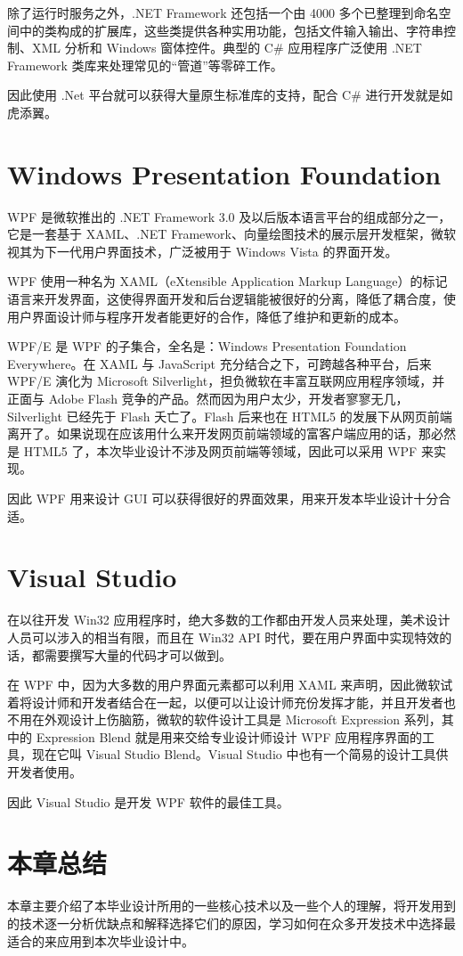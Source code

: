 除了运行时服务之外，.NET Framework 还包括一个由 4000 多个已整理到命名空间中的类构成的扩展库，这些类提供各种实用功能，包括文件输入输出、字符串控制、XML 分析和 Windows 窗体控件。典型的 C\# 应用程序广泛使用 .NET Framework 类库来处理常见的``管道''等零碎工作。

因此使用 .Net 平台就可以获得大量原生标准库的支持，配合 C\# 进行开发就是如虎添翼。

\section{Windows Presentation Foundation}

WPF 是微软推出的 .NET Framework 3.0 及以后版本语言平台的组成部分之一，它是一套基于 XAML、.NET Framework、向量绘图技术的展示层开发框架，微软视其为下一代用户界面技术，广泛被用于 Windows Vista 的界面开发。

WPF 使用一种名为 XAML（eXtensible Application Markup Language）的标记语言来开发界面，这使得界面开发和后台逻辑能被很好的分离，降低了耦合度，使用户界面设计师与程序开发者能更好的合作，降低了维护和更新的成本。

WPF/E 是 WPF 的子集合，全名是：Windows Presentation Foundation Everywhere。在 XAML 与 JavaScript 充分结合之下，可跨越各种平台，后来 WPF/E 演化为 Microsoft Silverlight，担负微软在丰富互联网应用程序领域，并正面与 Adobe Flash 竞争的产品。然而因为用户太少，开发者寥寥无几，Silverlight 已经先于 Flash 夭亡了。Flash 后来也在 HTML5 的发展下从网页前端离开了。如果说现在应该用什么来开发网页前端领域的富客户端应用的话，那必然是 HTML5 了，本次毕业设计不涉及网页前端等领域，因此可以采用 WPF 来实现。

因此 WPF 用来设计 GUI 可以获得很好的界面效果，用来开发本毕业设计十分合适。

\section{Visual Studio}

在以往开发 Win32 应用程序时，绝大多数的工作都由开发人员来处理，美术设计人员可以涉入的相当有限，而且在 Win32 API 时代，要在用户界面中实现特效的话，都需要撰写大量的代码才可以做到。

在 WPF 中，因为大多数的用户界面元素都可以利用 XAML 来声明，因此微软试着将设计师和开发者结合在一起，以便可以让设计师充份发挥才能，并且开发者也不用在外观设计上伤脑筋，微软的软件设计工具是 Microsoft Expression 系列，其中的 Expression Blend 就是用来交给专业设计师设计 WPF 应用程序界面的工具，现在它叫 Visual Studio Blend。Visual Studio 中也有一个简易的设计工具供开发者使用。

因此 Visual Studio 是开发 WPF 软件的最佳工具。

\section{本章总结}

本章主要介绍了本毕业设计所用的一些核心技术以及一些个人的理解，将开发用到的技术逐一分析优缺点和解释选择它们的原因，学习如何在众多开发技术中选择最适合的来应用到本次毕业设计中。
